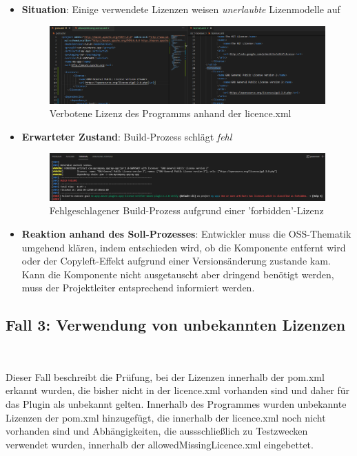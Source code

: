 \begin{itemize}
    \item \textbf{Situation}: Einige verwendete Lizenzen weisen \textit{unerlaubte} Lizenmodelle auf
    
    \begin{figure}[h]
        \centering
        \includegraphics[scale=0.4]{Bilder/Fall2Situation.png}
        \caption{Verbotene Lizenz des Programms anhand der licence.xml}
    \end{figure}

    \newpage
    \item \textbf{Erwarteter Zustand}: Build-Prozess schlägt \textit{fehl} 
    
    \begin{figure}[h]
        \centering
        \includegraphics[scale=0.4]{Bilder/Fall2Zustand.png}
        \caption{Fehlgeschlagener Build-Prozess aufgrund einer 'forbidden'-Lizenz}
    \end{figure}

    \item \textbf{Reaktion anhand des Soll-Prozesses}: Entwickler muss die OSS-Thematik umgehend klären, indem entschieden wird, ob die Komponente entfernt wird oder der Copyleft-Effekt aufgrund einer Versionsänderung zustande kam. Kann die Komponente nicht ausgetauscht aber dringend benötigt werden, muss der Projektleiter entsprechend informiert werden.  
\end{itemize}

\subsection{Fall 3: Verwendung von unbekannten Lizenzen} $~$

Dieser Fall beschreibt die Prüfung, bei der Lizenzen innerhalb der pom.xml erkannt wurden, die bisher nicht in der licence.xml vorhanden sind und daher für das Plugin als unbekannt gelten. Innerhalb des Programmes wurden unbekannte Lizenzen der pom.xml hinzugefügt, die innerhalb der licence.xml noch nicht vorhanden sind und Abhängigkeiten, die aussschließlich zu Testzwecken verwendet wurden, innerhalb der allowedMissingLicence.xml eingebettet. 

